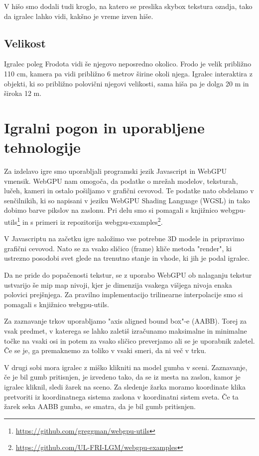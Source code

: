 \documentclass[a4paper,12pt]{article}
\begin{document}
V hišo smo dodali tudi kroglo, na katero se preslika skybox tekstura ozadja, tako da igralec lahko vidi, kakšno je vreme izven hiše.

\subsection{Velikost}
Igralec poleg Frodota vidi še njegovo neposredno okolico. Frodo je velik približno 110 cm, kamera pa vidi približno 6 metrov širine okoli njega. Igralec interaktira z objekti, ki so približno polovični njegovi velikosti, sama hiša pa je dolga 20 m in široka 12 m.


\section{Igralni pogon in uporabljene tehnologije}
Za izdelavo igre smo uporabljali programski jezik Javascript in WebGPU vmensik. WebGPU nam omogoča, da podatke o mrežah modelov, teksturah, lučeh, kameri in ostalo pošiljamo v grafični cevovod. Te podatke nato obdelamo v senčilnikih, ki so napisani v jeziku WebGPU Shading Language (WGSL) in tako dobimo barve pikslov na zaslonu. Pri delu smo si pomagali s knjižnico webgpu-utils\footnote{\url{https://github.com/greggman/webgpu-utils}} in s primeri iz repozitorija webgpu-examples\footnote{\url{https://github.com/UL-FRI-LGM/webgpu-examples}}.

V Javascriptu na začetku igre naložimo vse potrebne 3D modele in pripravimo grafični cevovod. Nato se za vsako sličico (frame) kliče metoda "render", ki ustrezno posodobi svet glede na trenutno stanje in vhode, ki jih je podal igralec.

Da ne pride do popačenosti tekstur, se z uporabo WebGPU ob nalaganju tekstur ustvarijo še mip map nivoji, kjer je dimenzija vsakega višjega nivoja enaka polovici prejšnjega. Za pravilno implementacijo trilinearne interpolacije smo si pomagali s knjižnico webgpu-utils.

Za zaznavanje trkov uporabljamo "axis aligned bound box"-e (AABB). Torej za vsak predmet, v katerega se lahko zaletiš izračunamo maksimalne in minimalne točke na vsaki osi in potem za vsako sličico preverjamo ali se je uporabnik zaletel. Če se je, ga premaknemo za toliko v vsaki smeri, da ni več v trku.

V drugi sobi mora igralec z miško klikniti na model gumba v sceni. Zaznavanje, če je bil gumb pritisnjen, je izvedeno tako, da se iz mesta na zaslon, kamor je igralec kliknil, sledi žarek na sceno. Za sledenje žarka moramo koordinate klika pretvoriti iz koordinatnega sistema zaslona v koordinatni sistem sveta. Če ta žarek seka AABB gumba, se smatra, da je bil gumb pritisnjen.
\end{document}
